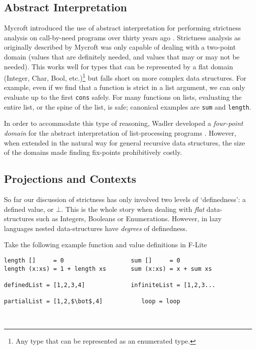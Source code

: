 \subsection{Abstract Interpretation}

Mycroft introduced the use of abstract interpretation for performing strictness
analysis on call-by-need programs over thirty years ago
\citep{mycroft1980theory}.
Strictness analysis as originally described by Mycroft was only capable of
dealing with a two-point domain (values that are definitely needed, and values
that may or may not be needed). This works well for types that can be
represented by a flat domain (Integer, Char, Bool, etc.)\footnote{Any type that
can be represented as an enumerated type.} but falls short on more complex data
structures. For example, even if we find that a function is strict in a list
argument, we can only evaluate up to the first \verb'cons' safely. For many
functions on lists, evaluating the entire list, or the spine of the list, is
safe; canonical examples are \verb'sum' and \verb'length'.

In order to accommodate this type of reasoning, Wadler developed a
\emph{four-point domain} for the abstract interpretation of list-processing
programs \citep{wadler1987strictness}. However, when extended in the natural way
for general recursive data structures, the size of the domains made finding
fix-points prohibitively costly.

\subsection{Projections and Contexts}
\label{sec:projections}

So far our discussion of strictness has only involved two levels of
`definedness': a defined value, or $\bot$. This is the whole story when dealing
with \emph{flat} data-structures such as Integers, Booleans or Enumerations.
However, in lazy languages nested data-structures have \emph{degrees} of
definedness.

Take the following example function and value definitions in F-Lite
\smallskip

\begin{centering}
\begin{BVerbatim}[commandchars=\\\{\}, codes={\catcode`$=3}]
length []     = 0                   sum []     = 0
length (x:xs) = 1 + length xs       sum (x:xs) = x + sum xs

definedList = [1,2,3,4]             infiniteList = [1,2,3...

partialList = [1,2,$\bot$,4]           loop = loop
\end{BVerbatim}
\end{centering}\\

